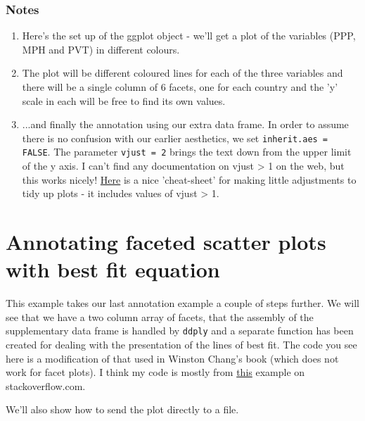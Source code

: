 \documentclass[titlepage]{book}\usepackage{knitr}
\begin{document}
\subsubsection{Notes}
\begin{enumerate}

\item{Here's the set up of the ggplot object - we'll get a plot of the variables (PPP, MPH and PVT) in different colours.}
\item{The plot will be different coloured lines for each of the three variables and there will be a single column of 6 facets, one for each country and the 'y' scale in each will be free to find its own values.}
\item{ ...and finally the annotation using our extra data frame.  In order to assume there is no confusion with our earlier aesthetics, we set \texttt{inherit.aes = FALSE}. The parameter \texttt{vjust = 2} brings the text down from the upper limit of the y axis. I can't find any documentation on vjust > 1 on the web, but this works nicely! \href{http://zevross.com/blog/2014/08/04/beautiful-plotting-in-r-a-ggplot2-cheatsheet-3/}{Here} is a nice 'cheat-sheet' for making little adjustments to tidy up plots - it includes values of vjust > 1.  }

\end{enumerate}

\section{Annotating faceted scatter plots with best fit equation}

This example takes our last annotation example a couple of steps further.  We will see that we have a two column array of facets, that the assembly of the supplementary data frame is handled by \texttt{ddply} and a separate function has been created for dealing with the presentation of the lines of best fit. The code you see here is a modification of that used in Winston Chang's book (which does not work for facet plots). I think my code is mostly from \href{http://stackoverflow.com/questions/19699858/ggplot-adding-regression-line-equation-and-r2-with-facet}{this} example on stackoverflow.com.

We'll also show how to send the plot directly to a file.
\end{document}
